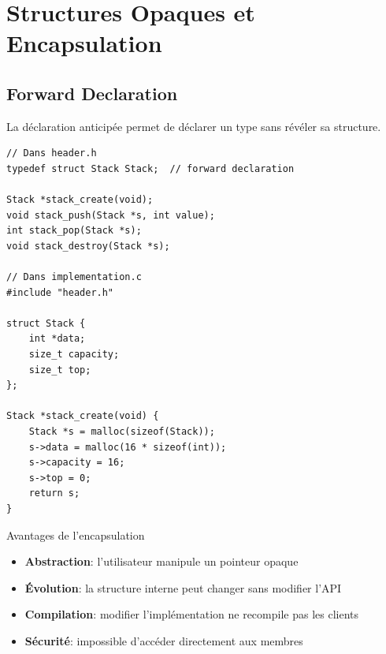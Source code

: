 \documentclass[10pt,a4paper]{article}
\begin{document}
\begin{center}
\end{center}

\section{Structures Opaques et Encapsulation}

\subsection{Forward Declaration}

La déclaration anticipée permet de déclarer un type sans révéler sa structure.

\begin{lstlisting}
// Dans header.h
typedef struct Stack Stack;  // forward declaration

Stack *stack_create(void);
void stack_push(Stack *s, int value);
int stack_pop(Stack *s);
void stack_destroy(Stack *s);

// Dans implementation.c
#include "header.h"

struct Stack {
    int *data;
    size_t capacity;
    size_t top;
};

Stack *stack_create(void) {
    Stack *s = malloc(sizeof(Stack));
    s->data = malloc(16 * sizeof(int));
    s->capacity = 16;
    s->top = 0;
    return s;
}
\end{lstlisting}

\begin{techbox}{Avantages de l'encapsulation}
\begin{itemize}
\item \textbf{Abstraction}: l'utilisateur manipule un pointeur opaque
\item \textbf{Évolution}: la structure interne peut changer sans modifier l'API
\item \textbf{Compilation}: modifier l'implémentation ne recompile pas les clients
\item \textbf{Sécurité}: impossible d'accéder directement aux membres
\end{itemize}
\end{techbox}
\end{document}
